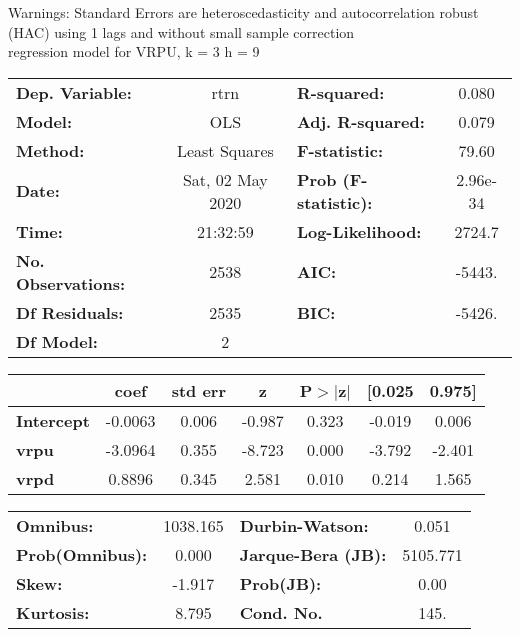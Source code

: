 Warnings: \newline
 [1] Standard Errors are heteroscedasticity and autocorrelation robust (HAC) using 1 lags and without small sample correction\\ 

regression model for VRPU, k = 3 h = 9\begin{center}
\begin{tabular}{lclc}
\toprule
\textbf{Dep. Variable:}    &       rtrn       & \textbf{  R-squared:         } &     0.080   \\
\textbf{Model:}            &       OLS        & \textbf{  Adj. R-squared:    } &     0.079   \\
\textbf{Method:}           &  Least Squares   & \textbf{  F-statistic:       } &     79.60   \\
\textbf{Date:}             & Sat, 02 May 2020 & \textbf{  Prob (F-statistic):} &  2.96e-34   \\
\textbf{Time:}             &     21:32:59     & \textbf{  Log-Likelihood:    } &    2724.7   \\
\textbf{No. Observations:} &        2538      & \textbf{  AIC:               } &    -5443.   \\
\textbf{Df Residuals:}     &        2535      & \textbf{  BIC:               } &    -5426.   \\
\textbf{Df Model:}         &           2      & \textbf{                     } &             \\
\bottomrule
\end{tabular}
\begin{tabular}{lcccccc}
                   & \textbf{coef} & \textbf{std err} & \textbf{z} & \textbf{P$> |$z$|$} & \textbf{[0.025} & \textbf{0.975]}  \\
\midrule
\textbf{Intercept} &      -0.0063  &        0.006     &    -0.987  &         0.323        &       -0.019    &        0.006     \\
\textbf{vrpu}      &      -3.0964  &        0.355     &    -8.723  &         0.000        &       -3.792    &       -2.401     \\
\textbf{vrpd}      &       0.8896  &        0.345     &     2.581  &         0.010        &        0.214    &        1.565     \\
\bottomrule
\end{tabular}
\begin{tabular}{lclc}
\textbf{Omnibus:}       & 1038.165 & \textbf{  Durbin-Watson:     } &    0.051  \\
\textbf{Prob(Omnibus):} &   0.000  & \textbf{  Jarque-Bera (JB):  } & 5105.771  \\
\textbf{Skew:}          &  -1.917  & \textbf{  Prob(JB):          } &     0.00  \\
\textbf{Kurtosis:}      &   8.795  & \textbf{  Cond. No.          } &     145.  \\
\bottomrule
\end{tabular}
\end{center}

